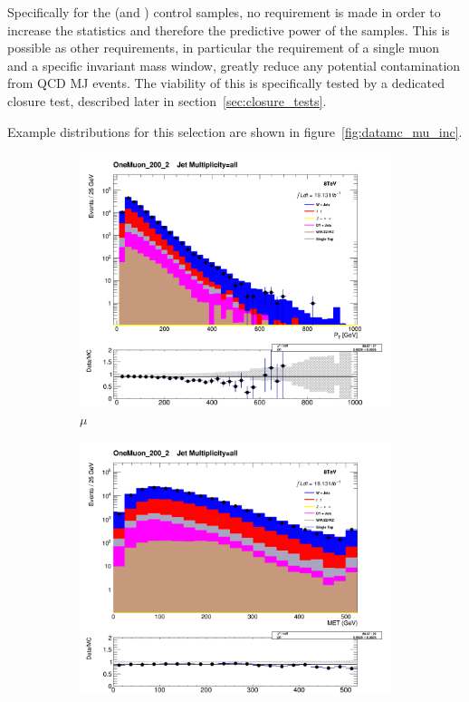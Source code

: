 Specifically for the \mj (and \mmj) control samples, no \alphat requirement is
made in order to increase the statistics and therefore the predictive power of 
the samples. This is possible as other requirements, in particular the 
requirement of
a single muon and a specific invariant mass window, greatly reduce any potential
contamination from QCD MJ events. The viability of this is specifically tested 
by a dedicated closure test, described later in section~\ref{sec:closure_tests}.

Example distributions for this selection are shown in figure~\ref{fig:datamc_mu_inc}.

\begin{figure}[!ht]
  \centering
    \begin{subfigure}[b]{0.48\textwidth}
      \includegraphics[width=\textwidth]{Figs/datamc/mu/Stacked_MuPt_all_OneMuon_200_upwards}
      \caption{$\mu$\Pt}
    \end{subfigure}
    \begin{subfigure}[b]{0.48\textwidth}
      \includegraphics[width=\textwidth]{Figs/datamc/mu/Stacked_MET_Corrected_all_OneMuon_200_upwards}

\end{subfigure}
\end{figure}
